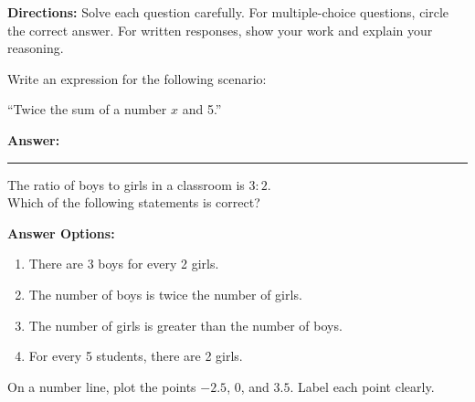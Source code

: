 \documentclass[12pt]{article}
\begin{document}

\begin{tcolorbox}[colframe=black!50, colback=white, title=Assessment Directions]
\textbf{Directions:} Solve each question carefully. For multiple-choice questions, circle the correct answer. For written responses, show your work and explain your reasoning.
\end{tcolorbox}

\begin{tcolorbox}[colframe=black!50, colback=white, title=\textbf{Problem 1}]
Write an expression for the following scenario: 

``Twice the sum of a number \(x\) and 5.'' 

\vspace{2cm}
\textbf{Answer:} \rule{0.5\textwidth}{0.4mm}
\end{tcolorbox}

\begin{tcolorbox}[colframe=black!50, colback=white, title=\textbf{Problem 2}]
The ratio of boys to girls in a classroom is \(3:2\). \\ Which of the following statements is correct?

\textbf{Answer Options:}
\begin{enumerate}[label=(\Alph*), itemsep=0.5cm]
    \item There are 3 boys for every 2 girls.
    \item The number of boys is twice the number of girls.
    \item The number of girls is greater than the number of boys.
    \item For every 5 students, there are 2 girls.
\end{enumerate}
\vspace{1cm}
\end{tcolorbox}

\begin{tcolorbox}[colframe=black!50, colback=white, title=\textbf{Problem 3}]
On a number line, plot the points \(-2.5\), \(0\), and \(3.5\). Label each point clearly.

\begin{center}
\end{center}
\vspace{1cm}
\end{tcolorbox}
\end{document}
